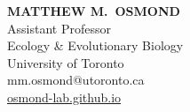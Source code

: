 \documentclass[12pt]{article}
\begin{document}
\thispagestyle{empty} 
\pagestyle{fancy}

{\raggedleft
\noindent\Large{\textbf{MATTHEW M.\ OSMOND}}\\
\large Assistant Professor\\
\large Ecology \& Evolutionary Biology\\
\large University of Toronto \\
\large mm.osmond@utoronto.ca\\
\href{https:/osmond-lab.github.io}{osmond-lab.github.io}\\
}



%
\end{document}

